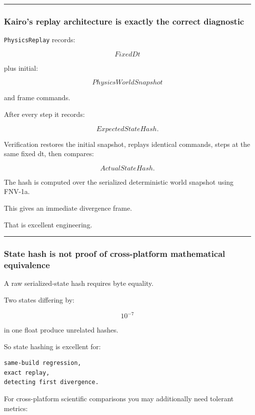 \begin{center}\rule{0.5\linewidth}{0.5pt}\end{center}

\subsubsection{Kairo's replay architecture is exactly the correct diagnostic}\label{kairos-replay-architecture-is-exactly-the-correct-diagnostic}

\texttt{PhysicsReplay} records:

\[
FixedDt
\]

plus initial:

\[
PhysicsWorldSnapshot
\]

and frame commands.

After every step it records:

\[
ExpectedStateHash.
\]

Verification restores the initial snapshot, replays identical commands, steps at the same fixed dt, then compares:

\[
ActualStateHash.
\]

The hash is computed over the serialized deterministic world snapshot using FNV-1a.

This gives an immediate divergence frame.

That is excellent engineering.

\begin{center}\rule{0.5\linewidth}{0.5pt}\end{center}

\subsubsection{State hash is not proof of cross-platform mathematical equivalence}\label{state-hash-is-not-proof-of-cross-platform-mathematical-equivalence}

A raw serialized-state hash requires byte equality.

Two states differing by:

\[
10^{-7}
\]

in one float produce unrelated hashes.

So state hashing is excellent for:

\begin{verbatim}
same-build regression,
exact replay,
detecting first divergence.
\end{verbatim}

For cross-platform scientific comparisons you may additionally need tolerant metrics:

